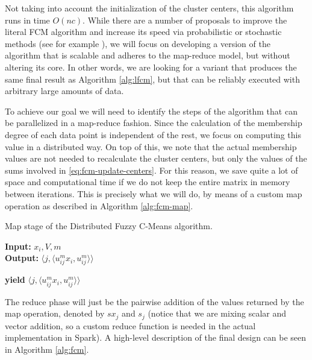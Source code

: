 Not taking into account the initialization of the cluster centers, this algorithm runs in time $O(nc)$. While there are a number of proposals to improve the literal FCM algorithm and increase its speed via probabilistic or stochastic methods (see for example \cite{pham2001probabilistic}), we will focus on developing a version of the algorithm that is scalable and adheres to the map-reduce model, but without altering its core. In other words, we are looking for a variant that produces the same final result as Algorithm \ref{alg:lfcm}, but that can be reliably executed with arbitrary large amounts of data.

To achieve our goal we will need to identify the steps of the algorithm that can be parallelized in a map-reduce fashion. Since the calculation of the membership degree of each data point is independent of the rest, we focus on computing this value in a distributed way. On top of this, we note that the actual membership values are not needed to recalculate the cluster centers, but only the values of the sums involved in \eqref{eq:fcm-update-centers}. For this reason, we save quite a lot of space and computational time if we do not keep the entire matrix in memory between iterations. This is precisely what we will do, by means of a custom map operation as described in Algorithm \ref{alg:fcm-map}.

\begin{algorithm}
  \caption{Map stage of the Distributed Fuzzy C-Means algorithm.}
    \label{alg:fcm-map}
    \textbf{Input:} $x_i,V,m$\\
    \textbf{Output:} $\langle j, \langle u_{ij}^m x_i, u_{ij}^m \rangle \rangle$
  \begin{algorithmic}[1]
      \State \textbf{yield} $\langle j, \langle u_{ij}^m x_i, u_{ij}^m \rangle \rangle$ 
    \EndFor
  \end{algorithmic}
\end{algorithm}

The reduce phase will just be the pairwise addition of the values returned by the map operation, denoted by $sx_j$ and $s_j$ (notice that we are mixing scalar and vector addition, so a custom reduce function is needed in the actual implementation in Spark). A high-level description of the final design can be seen in Algorithm \ref{alg:fcm}.

